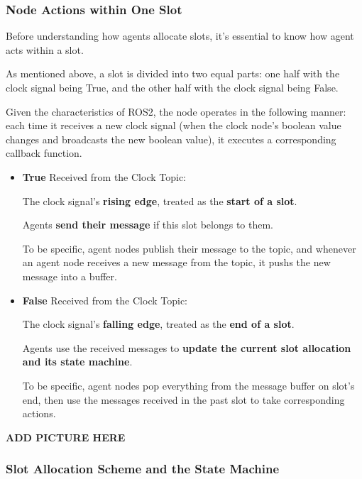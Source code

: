 \subsubsection{Node Actions within One Slot}


Before understanding how agents allocate slots, it's essential to know how agent acts within a slot.

As mentioned above, a slot is divided into two equal parts: one half with the clock signal being True, and the other half with the clock signal being False.

Given the characteristics of ROS2, the node operates in the following manner: each time it receives a new clock signal (when the clock node's boolean value changes and broadcasts the new boolean value), it executes a corresponding callback function.

\begin{itemize}
    \item \textbf{True} Received from the Clock Topic: 
    
    The clock signal's \textbf{rising edge}, treated as the \textbf{start of a slot}.

    Agents \textbf{send their message} if this slot belongs to them. 

    To be specific, agent nodes publish their message to the topic, and whenever an agent node receives a new message from the topic, it pushs the new message into a buffer.

    
    \item \textbf{False} Received from the Clock Topic:
    
    The clock signal's \textbf{falling edge}, treated as the \textbf{end of a slot}.
    
    Agents use the received messages to \textbf{update the current slot allocation and its state machine}.

    To be specific, agent nodes pop everything from the message buffer on slot's end, then use the messages received in the past slot to take corresponding actions.

\end{itemize}

\textbf{ADD PICTURE HERE}

\subsubsection{Slot Allocation Scheme and the State Machine}

